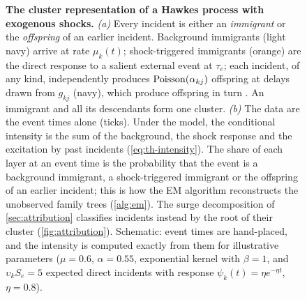 \begin{figure}[t]
\caption{\textbf{The cluster representation of a Hawkes process with
exogenous shocks.} \emph{(a)} Every incident is either an \emph{immigrant}
or the \emph{offspring} of an earlier incident. Background immigrants (light
navy) arrive at rate $\mu_k(t)$; shock-triggered immigrants (orange) are the
direct response to a salient external event at $\tau_e$; each incident, of
any kind, independently produces $\operatorname{Poisson}(\alpha_{kj})$ offspring at delays
drawn from $g_{kj}$ (navy), which produce offspring in turn
\citep{hawkes1974}. An immigrant and all its descendants form one cluster.
\emph{(b)} The data are the event times alone (ticks). Under the model, the
conditional intensity is the sum of the background, the shock response and
the excitation by past incidents (\cref{eq:th-intensity}). The share of each
layer at an event time is the probability that the event is a background
immigrant, a shock-triggered immigrant or the offspring of an earlier
incident; this is how the EM algorithm reconstructs the unobserved family
trees (\cref{alg:em}). The surge decomposition of \cref{sec:attribution}
classifies incidents instead by the root of their cluster
(\cref{fig:attribution}). Schematic: event times are
hand-placed, and the intensity is computed exactly from them for
illustrative parameters ($\mu=0.6$, $\alpha=0.55$, exponential kernel
with $\beta=1$, and $\upsilon_kS_e=5$ expected direct incidents with
response $\psi_k(t)=\eta e^{-\eta t}$, $\eta=0.8$).}
\label{fig:branching}
\end{figure}
